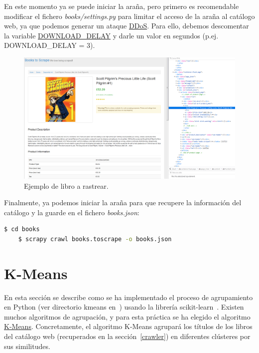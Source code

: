 \documentclass{uimppracticas}
\begin{document}
En este momento ya se puede iniciar la araña, pero primero es recomendable modificar el fichero \textit{books/settings.py} para limitar el acceso de la araña al catálogo web, ya que podemos generar un ataque \href{https://es.wikipedia.org/wiki/Ataque_de_denegaci%C3%B3n_de_servicio}{DDoS}. Para ello, debemos descomentar la variable \href{https://docs.scrapy.org/en/latest/topics/settings.html#download-delay}{DOWNLOAD\_DELAY} y darle un valor en segundos (p.ej. DOWNLOAD\_DELAY = 3). 	
	
\begin{figure}[h]
	\centering
	\includegraphics[scale=0.35]{images/book}
	\caption{Ejemplo de libro a rastrear.}
	\label{book}
\end{figure}

Finalmente, ya podemos iniciar la araña para que recupere la información del catálogo y la guarde en el fichero \textit{books.json}:

\begin{lstlisting}[language=bash]
	$ cd books
	$ scrapy crawl books.toscrape -o books.json
\end{lstlisting}

\section{K-Means}\label{kmeans} 

En esta sección se describe como se ha implementado el proceso de agrupamiento en Python (ver directorio kmeans en~\cite{GitHubRepo}) usando la librería scikit-learn~\cite{scikit-learn}. Existen muchos algoritmos de agrupación, y para esta práctica se ha elegido el algoritmo \href{https://scikit-learn.org/stable/modules/generated/sklearn.cluster.KMeans.html}{K-Means}. Concretamente, el algoritmo K-Means agrupará los títulos de los libros del catálogo web (recuperados en la sección~\ref{crawler}) en diferentes clústeres por sus similitudes.
\end{document}
